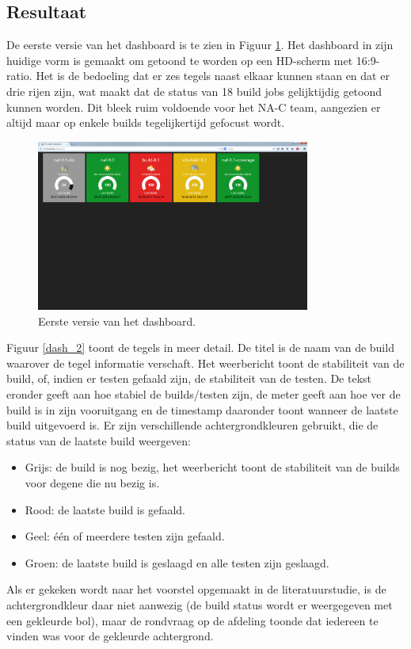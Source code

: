 \documentclass[10pt,a4paper]{article}
\begin{document}
\subsection{Resultaat}
\label{resultaat}
De eerste versie van het dashboard is te zien in Figuur \ref{dash_1}. Het dashboard in zijn huidige vorm is gemaakt om getoond te worden op een HD-scherm met 16:9-ratio. Het is de bedoeling dat er zes tegels naast elkaar kunnen staan en dat er drie rijen zijn, wat maakt dat de status van 18 build jobs gelijktijdig getoond kunnen worden. Dit bleek ruim voldoende voor het NA-C team, aangezien er altijd maar op enkele builds tegelijkertijd gefocust wordt.

\begin{figure}[ht!]
\centering
\includegraphics[width=90mm]{dashboard_screenshot1.png}
\caption{Eerste versie van het dashboard.} 
\label{dash_1}
\end{figure}

Figuur \ref{dash_2} toont de tegels in meer detail. De titel is de naam van de build waarover de tegel informatie verschaft. Het weerbericht toont de stabiliteit van de build, of, indien er testen gefaald zijn, de stabiliteit van de testen. De tekst eronder geeft aan hoe stabiel de builds/testen zijn, de meter geeft aan hoe ver de build is in zijn vooruitgang en de timestamp daaronder toont wanneer de laatste build uitgevoerd is.
Er zijn verschillende achtergrondkleuren gebruikt, die de status van de laatste build weergeven:
\begin{itemize}
\item Grijs: de build is nog bezig, het weerbericht toont de stabiliteit van de builds voor degene die nu bezig is.
\item Rood: de laatste build is gefaald.
\item Geel: \'e\'en of meerdere testen zijn gefaald.
\item Groen: de laatste build is geslaagd en alle testen zijn geslaagd. 
\end{itemize}
Als er gekeken wordt naar het voorstel opgemaakt in de literatuurstudie, is de achtergrondkleur daar niet aanwezig (de build status wordt er weergegeven met een gekleurde bol), maar de rondvraag op de afdeling toonde dat iedereen te vinden was voor de gekleurde achtergrond.
\end{document}

